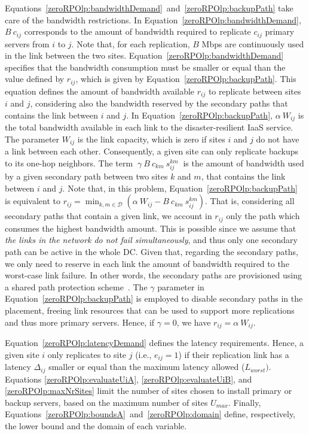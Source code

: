 \documentclass[preprint]{elsarticle}
\begin{document}
Equations~\ref{zeroRPOlp:bandwidthDemand}~and~\ref{zeroRPOlp:backupPath} take care of the bandwidth restrictions. In Equation~\ref{zeroRPOlp:bandwidthDemand}, $B \ c_{ij}$ corresponds to the amount of bandwidth required to replicate $c_{ij}$ primary servers from $i$ to $j$.
Note that, for each replication, $B$ Mbps are continuously used in the link between the two sites. Equation~\ref{zeroRPOlp:bandwidthDemand} specifies that the bandwidth consumption must be smaller or equal than the value defined by $r_{ij}$, which is given by Equation~\ref{zeroRPOlp:backupPath}.
This equation defines the amount of bandwidth available $r_{ij}$ to replicate between sites $i$ and $j$, considering also the bandwidth reserved by the secondary paths that contains the link between $i$ and $j$. In Equation~\ref{zeroRPOlp:backupPath}, $\alpha \ W_{ij}$ is the total bandwidth available in each link to the disaster-resilient IaaS service. The parameter $W_{ij}$ is the link capacity, which is zero if sites $i$ and $j$ do not have a link between each other. Consequently, a given site can only replicate backups to its one-hop neighbors. The term $ \ \gamma \ B \ c_{km} \ s^{km}_{ij} \ $ is the amount of bandwidth used by a given secondary path between two sites $k$ and $m$, that contains the link between $i$ and $j$. 
Note that, in this problem, Equation~\ref{zeroRPOlp:backupPath} is equivalent to $r_{ij} = \min_{k,m \in \mathcal{D}} (\alpha \ W_{ij} - B  \ c_{km} \ s^{km}_{ij})$. That is, considering all secondary paths that contain a given link, we account in $r_{ij}$ only the path which consumes the highest bandwidth amount.
This is possible since we assume that \textit{the links in the network do not fail simultaneously}, and thus only one secondary path can be active in the whole DC. 
Given that, regarding the secondary paths, we only need to reserve in each link the amount of bandwidth required to the worst-case link failure.
In other words, the secondary paths are provisioned using a shared path protection scheme~\cite{ramamurthy2003survivable}.
The $\gamma$ parameter in Equation~\ref{zeroRPOlp:backupPath} is employed to disable secondary paths in the placement, freeing link resources that can be used to support more replications and thus more primary servers. Hence, if $\gamma = 0$, we have $r_{ij} = \alpha \ W_{ij}$.

Equation~\ref{zeroRPOlp:latencyDemand} defines the latency requirements. Hence, a given site $i$ only replicates to site $j$ (i.e., $e_{ij}=1$) if their replication link has a latency $\Delta_{ij}$ smaller or equal than the maximum latency allowed ($L_{worst})$. Equations \ref{zeroRPOlp:evaluateUiA}, \ref{zeroRPOlp:evaluateUiB}, and \ref{zeroRPOlp:maxNrSites} limit the number of sites chosen to install primary or backup servers, based on the maximum number of sites $U_{max}$. Finally, Equations~\ref{zeroRPOlp:boundsA}~and~\ref{zeroRPOlp:domain} define, respectively, the lower bound and the domain of each variable.  
\end{document}
